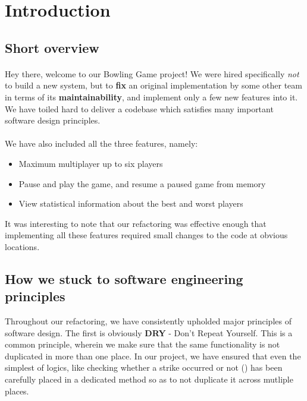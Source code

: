 \section{Introduction}

\subsection{Short overview}

\paragraph{} Hey there, welcome to our Bowling Game project! We were hired specifically \textit{not} to build a new system, but to \textbf{fix} an original implementation by some other team in terms of its \textbf{maintainability}, and implement only a few new features into it. We have toiled hard to deliver a codebase which satisfies many important software design principles.
\paragraph{} We have also included all the three features, namely:
\begin{itemize}
    \item Maximum multiplayer up to six players
    \item Pause and play the game, and resume a paused game from memory
    \item View statistical information about the best and worst players
\end{itemize}

It was interesting to note that our refactoring was effective enough that implementing all these features required small changes to the code at obvious locations.

\subsection{How we stuck to software engineering principles}

Throughout our refactoring, we have consistently upholded major principles of software design. The first is obviously \textbf{DRY} - Don't Repeat Yourself. This is a common principle, wherein we make sure that the same functionality is not duplicated in more than one place. In our project, we have ensured that even the simplest of logics, like checking whether a strike occurred or not () has been carefully placed in a dedicated method so as to not duplicate it across mutliple places.

